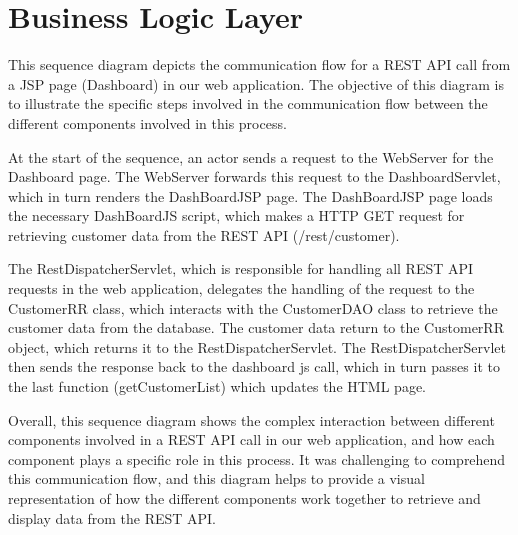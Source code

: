 \section{Business Logic Layer}


This sequence diagram depicts the communication flow for a REST API call from a JSP page (Dashboard) in our web application. The objective of this diagram is to illustrate the specific steps involved in the communication flow between the different components involved in this process.

\vspace{10pt} 

At the start of the sequence, an actor sends a request to the WebServer for the Dashboard page. The WebServer forwards this request to the DashboardServlet, which in turn renders the DashBoardJSP page. The DashBoardJSP page loads the necessary DashBoardJS script, which makes a HTTP GET request for retrieving customer data from the REST API (/rest/customer).

\vspace{10pt} 

The RestDispatcherServlet, which is responsible for handling all REST API requests in the web application, delegates the handling of the request to the CustomerRR class, which interacts with the CustomerDAO class to retrieve the customer data from the database. The customer data return to the CustomerRR object, which returns it to the RestDispatcherServlet. The RestDispatcherServlet then sends the response back to the dashboard js call, which in turn passes it to the last function (getCustomerList) which updates the HTML page.  

\vspace{10pt} 

Overall, this sequence diagram shows the complex interaction between different components involved in a REST API call in our web application, and how each component plays a specific role in this process. It was challenging to comprehend this communication flow, and this diagram helps to provide a visual representation of how the different components work together to retrieve and display data from the REST API.





